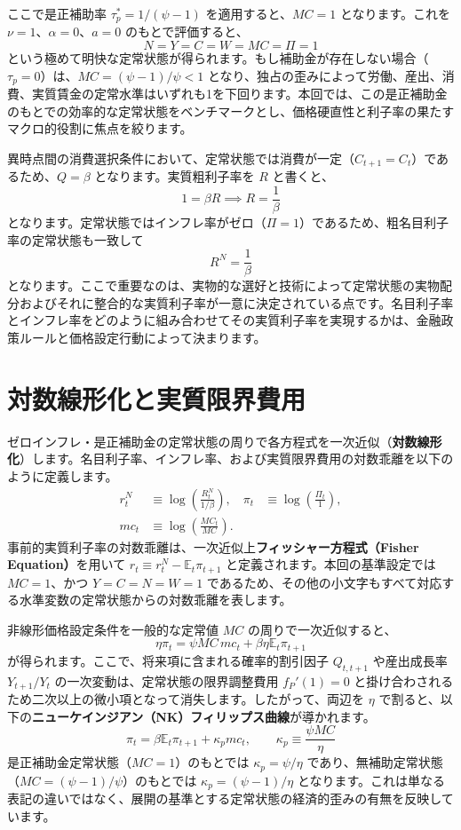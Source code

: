 \documentclass[
  japanese,
  lualatex,
  ja=standard,
  12pt,
  a4paper]{ltjsarticle}
\begin{document}
ここで是正補助率 \(\tau_p^*=1/(\psi-1)\) を適用すると、\(MC=1\)
となります。これを \(\nu=1\)、\(\alpha=0\)、\(a=0\) のもとで評価すると、
\[
N=Y=C=W=MC=\Pi=1
\]
という極めて明快な定常状態が得られます。もし補助金が存在しない場合（\(\tau_p=0\)）は、\(MC=(\psi-1)/\psi<1\)
となり、独占の歪みによって労働、産出、消費、実質賃金の定常水準はいずれも1を下回ります。本回では、この是正補助金のもとでの効率的な定常状態をベンチマークとし、価格硬直性と利子率の果たすマクロ的役割に焦点を絞ります。

異時点間の消費選択条件において、定常状態では消費が一定（\(C_{t+1}=C_t\)）であるため、\(Q=\beta\)
となります。実質粗利子率を \(R\) と書くと、 \[
1=\beta R \implies R=\frac{1}{\beta}
\]
となります。定常状態ではインフレ率がゼロ（\(\Pi=1\)）であるため、粗名目利子率の定常状態も一致して
\[
R^N=\frac{1}{\beta}
\]
となります。ここで重要なのは、実物的な選好と技術によって定常状態の実物配分およびそれに整合的な実質利子率が一意に決定されている点です。名目利子率とインフレ率をどのように組み合わせてその実質利子率を実現するかは、金融政策ルールと価格設定行動によって決まります。

\section{対数線形化と実質限界費用}\label{ux5bfeux6570ux7ddaux5f62ux5316ux3068ux5b9fux8ceaux9650ux754cux8cbbux7528}

ゼロインフレ・是正補助金の定常状態の周りで各方程式を一次近似（\textbf{対数線形化}）します。名目利子率、インフレ率、および実質限界費用の対数乖離を以下のように定義します。
\[
\begin{aligned}
r_t^N&\equiv\log\left(\frac{R_t^N}{1/\beta}\right),
&\pi_t&\equiv\log\left(\frac{\Pi_t}{1}\right),\\
mc_t&\equiv\log\left(\frac{MC_t}{MC}\right).
\end{aligned}
\]
事前的実質利子率の対数乖離は、一次近似上\textbf{フィッシャー方程式（Fisher
Equation）}を用いて \(r_t \equiv r_t^N - \mathbb{E}_t \pi_{t+1}\)
と定義されます。本回の基準設定では \(MC=1\)、かつ \(Y=C=N=W=1\)
であるため、その他の小文字もすべて対応する水準変数の定常状態からの対数乖離を表します。

非線形価格設定条件を一般的な定常値 \(MC\) の周りで一次近似すると、 \[
\eta\pi_t
=\psi MC\,mc_t
+\beta\eta\mathbb{E}_t\pi_{t+1}
\] が得られます。ここで、将来項に含まれる確率的割引因子 \(Q_{t,t+1}\)
や産出成長率 \(Y_{t+1}/Y_t\) の一次変動は、定常状態の限界調整費用
\(f_P'(1)=0\)
と掛け合わされるため二次以上の微小項となって消失します。したがって、両辺を
\(\eta\)
で割ると、以下の\textbf{ニューケインジアン（NK）フィリップス曲線}が導かれます。
\[
\pi_t
=\beta\mathbb{E}_t\pi_{t+1}
+\kappa_pmc_t,
\qquad
\kappa_p\equiv\frac{\psi MC}{\eta}
\] 是正補助金定常状態（\(MC=1\)）のもとでは \(\kappa_p=\psi/\eta\)
であり、無補助定常状態（\(MC=(\psi-1)/\psi\)）のもとでは
\(\kappa_p=(\psi-1)/\eta\)
となります。これは単なる表記の違いではなく、展開の基準とする定常状態の経済的歪みの有無を反映しています。
\end{document}
